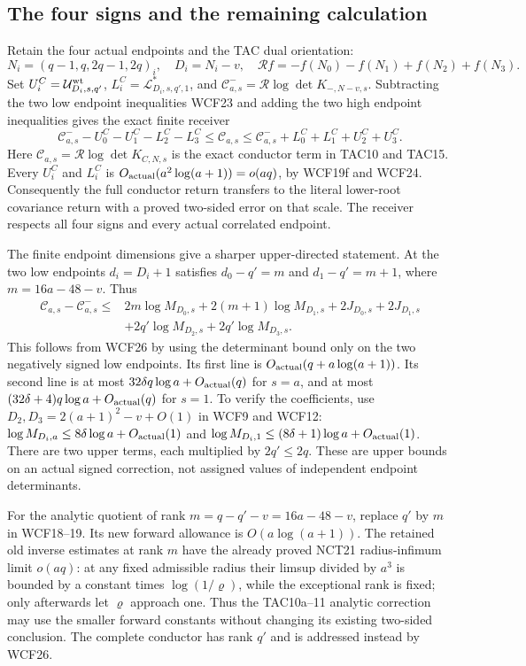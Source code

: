 \subsection{The four signs and the remaining calculation}

Retain the four actual endpoints and the TAC dual orientation:
\[
 N_i=(q-1,q,2q-1,2q)_i,\quad D_i=N_i-v,\quad
 \mathcal R f=-f(N_0)-f(N_1)+f(N_2)+f(N_3).
 \tag{WCF25}
\]
Set $U_i^C=\mathcal U^{\rm wt}_{D_i,s,q'}$,
$L_i^C=\mathcal L_{D_i,s,q',1}^*$, and
$\mathcal C^-_{a,s}=\mathcal R\log\det K_{-,N-v,s}$.
Subtracting the two low endpoint inequalities WCF23 and adding the
two high endpoint inequalities gives the exact finite receiver
\[
 \boxed{\quad
 \mathcal C^-_{a,s}-U_0^C-U_1^C-L_2^C-L_3^C
 \le\mathcal C_{a,s}
 \le\mathcal C^-_{a,s}+L_0^C+L_1^C+U_2^C+U_3^C.
 \quad}\tag{WCF26}
\]
Here $\mathcal C_{a,s}=\mathcal R\log\det K_{C,N,s}$ is the exact
conductor term in TAC10 and TAC15. Every $U_i^C$ and $L_i^C$ is
$O_{\rm actual}(a^2\log(a+1))=o(aq)$, by WCF19f and WCF24.
Consequently the full conductor return transfers to the literal
lower-root covariance return with a proved two-sided error on that
scale. The receiver respects all four signs and every actual correlated
endpoint.

The finite endpoint dimensions give a sharper upper-directed statement.
At the two low endpoints $d_i=D_i+1$ satisfies
$d_0-q'=m$ and $d_1-q'=m+1$, where $m=16a-48-v$. Thus
\[
 \begin{split}
 \mathcal C_{a,s}-\mathcal C^-_{a,s}
 \le{}&2m\log M_{D_0,s}+2(m+1)\log M_{D_1,s}
            +2J_{D_0,s}+2J_{D_1,s}\\
       &+2q'\log M_{D_2,s}+2q'\log M_{D_3,s}.
 \end{split}\tag{WCF26a}
\]
This follows from WCF26 by using the determinant bound only on the
two negatively signed low endpoints. Its first line is
$O_{\rm actual}(q+a\log(a+1))$. Its second line is at most
$32\delta q\log a+O_{\rm actual}(q)$ for $s=a$, and at most
$(32\delta+4)q\log a+O_{\rm actual}(q)$ for $s=1$. To verify the
coefficients, use $D_2,D_3=2(a+1)^2-v+O(1)$ in WCF9 and WCF12:
$\log M_{D_i,a}\le8\delta\log a+O_{\rm actual}(1)$ and
$\log M_{D_i,1}\le(8\delta+1)\log a+O_{\rm actual}(1)$.
There are two upper terms, each multiplied by $2q'\le2q$.
These are upper bounds on an actual signed correction, not assigned
values of independent endpoint determinants.

For the analytic quotient of rank $m=q-q'-v=16a-48-v$, replace
$q'$ by $m$ in WCF18--19. Its new forward allowance is
$O(a\log(a+1))$. The retained old inverse estimates at rank $m$
have the already proved NCT21 radius-infimum limit $o(aq)$:
at any fixed admissible radius their limsup divided by $a^3$ is
bounded by a constant times $\log(1/\varrho)$, while the exceptional
rank is fixed; only afterwards let $\varrho$ approach one. Thus the
TAC10a--11 analytic correction may use the smaller forward constants
without changing its existing two-sided conclusion. The complete
conductor has rank $q'$ and is addressed instead by WCF26.

